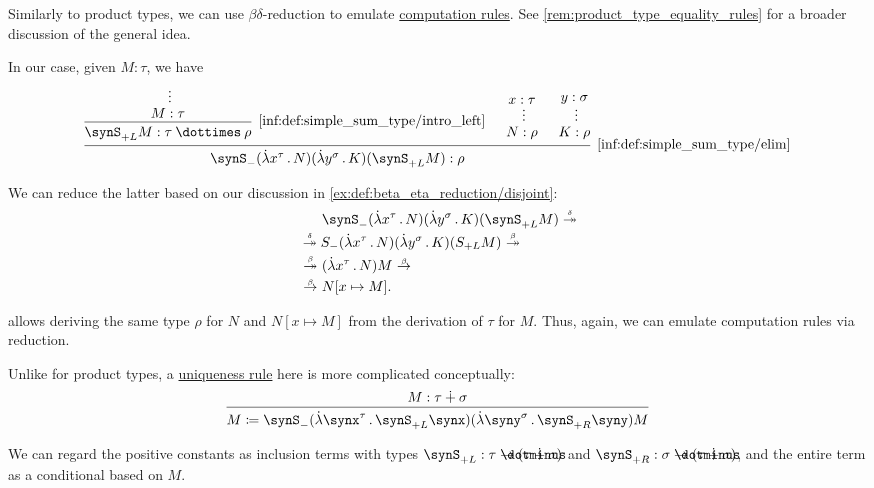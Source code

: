 \begin{remark}\label{rem:sum_type_equality_rules}
  Similarly to product types, we can use \( \beta\delta \)-reduction to emulate \hyperref[rem:type_theory_rule_classification/equality/comp]{computation rules}. See \cref{rem:product_type_equality_rules} for a broader discussion of the general idea.

  In our case, given \( M: \tau \), we have
  \begin{equation*}
    \begin{prooftree}
      \hypo{}
      \ellipsis {} { M: \tau }
      \infer1[\ref{inf:def:simple_sum_type/intro_left}]{ \synS_{+L} M: \tau \syntimes \rho }

      \hypo{ x: \tau }
      \ellipsis {} { N: \rho }

      \hypo{ y: \sigma }
      \ellipsis {} { K: \rho }

      \infer3[\ref{inf:def:simple_sum_type/elim}]{ \synS_- (\qabs {x^\tau} N) (\qabs {y^\sigma} K) (\synS_{+L} M): \rho }
    \end{prooftree}
  \end{equation*}

  We can reduce the latter based on our discussion in \cref{ex:def:beta_eta_reduction/disjoint}:
  \begin{align*}
    &\phantom{{}\bred*{}}
    \synS_- (\qabs {x^\tau} N) (\qabs {y^\sigma} K) (\synS_{+L} M)
    \dred* \\ &\dred*
    S_- (\qabs {x^\tau} N) (\qabs {y^\sigma} K) (S_{+L} M)
    \bred* \\ &\bred*
    (\qabs {x^\tau} N) M
    \bred \\ &\bred
    N[x \mapsto M].
  \end{align*}

   allows deriving the same type \( \rho \) for \( N \) and \( N[x \mapsto M] \) from the derivation of \( \tau \) for \( M \). Thus, again, we can emulate computation rules via reduction.

  Unlike for product types, a \hyperref[rem:type_theory_rule_classification/equality/uniq]{uniqueness rule} here is more complicated conceptually:
  \begin{equation*}
    \begin{prooftree}
      \hypo{ M: \tau \synplus \sigma }
      \infer1{ M \coloneqq \synS_- (\qabs {\synx^\tau} \synS_{+L} \synx) (\qabs {\syny^\sigma} \synS_{+R} \syny) M }
    \end{prooftree}
  \end{equation*}

  We can regard the positive constants as inclusion terms with types \( \synS_{+L}: \tau \synimplies (\tau \synplus \sigma) \) and \( \synS_{+R}: \sigma \synimplies (\tau \synplus \sigma) \), and the entire term as a conditional based on \( M \).
\end{remark}

